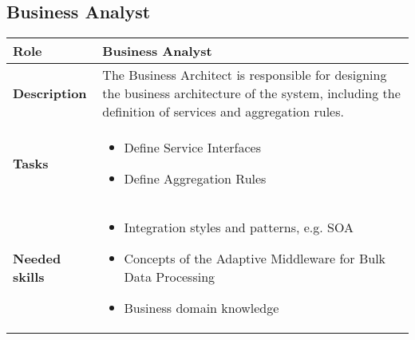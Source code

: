 \subsection{Business Analyst}
\begin{minipage}{\textwidth}
 \label{table:ch6_Role_Business_Analysist}
\begin{tabular}
	{|m{2cm}|m{10cm}|} \hline \bfseries Role & Business Analyst\\
	\hline \bfseries Description & The Business Architect is responsible for designing the business architecture of the system, including the definition of services and aggregation rules.\\
	\hline \bfseries Tasks & 
	\begin{itemize}
		\item Define Service Interfaces
		\item Define Aggregation Rules
	\end{itemize}
	\\
	\hline 
	\bfseries Needed skills &
	\begin{itemize}
		\item Integration styles and patterns, e.g. \ac{SOA}
		\item Concepts of the Adaptive Middleware for Bulk Data Processing
		\item Business domain knowledge
	\end{itemize}
	\\
	\hline
\end{tabular}
\end{minipage}


